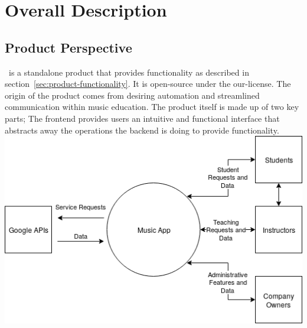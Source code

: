 \section{Overall Description}\label{sec:overall-description}
    \subsection{Product Perspective}\label{sec:product-perspective}
        \projectName\ is a standalone product that provides functionality as described in section~\ref{sec:product-functionality}. It is \gls{open-source} under the \gls{our-license}. The origin of the product comes from desiring automation and streamlined communication within music education. The product itself is made up of two key parts; The frontend provides users an intuitive and functional interface that abstracts away the operations the backend is doing to provide functionality.
        \\\includegraphics[width=\textwidth]{images/Context-Diagram.png}
